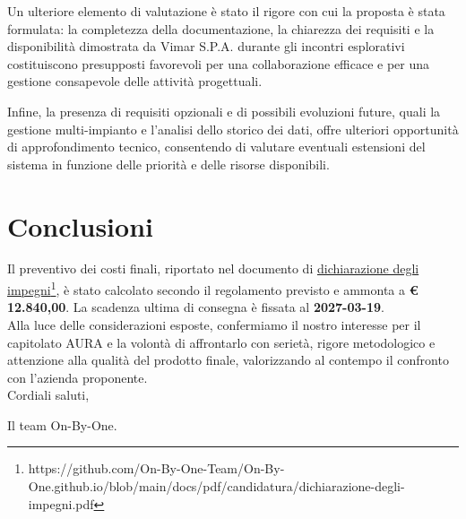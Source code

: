 \documentclass[11pt, a4paper]{article}
\begin{document}
\noindent Un ulteriore elemento di valutazione è stato il rigore con cui la proposta è stata formulata: la completezza della documentazione, la chiarezza dei requisiti e la disponibilità dimostrata da Vimar S.P.A. durante gli incontri esplorativi costituiscono presupposti favorevoli per una collaborazione efficace e per una gestione consapevole delle attività progettuali.

\noindent Infine, la presenza di requisiti opzionali e di possibili evoluzioni future, quali la gestione multi-impianto e l'analisi dello storico dei dati, offre ulteriori opportunità di approfondimento tecnico, consentendo di valutare eventuali estensioni del sistema in funzione delle priorità e delle risorse disponibili. \\

\section{Conclusioni} Il preventivo dei costi finali, riportato nel documento di \href{https://github.com/On-By-One-Team/On-By-One.github.io/blob/main/docs/pdf/candidatura/dichiarazione-degli-impegni.pdf}{dichiarazione degli impegni}\footnote{https://github.com/On-By-One-Team/On-By-One.github.io/blob/main/docs/pdf/candidatura/dichiarazione-degli-impegni.pdf}, è stato calcolato secondo il regolamento previsto e ammonta a \textbf{€ 12.840,00}. La scadenza ultima di consegna è fissata al \textbf{2027-03-19}. \\

\noindent Alla luce delle considerazioni esposte, confermiamo il nostro interesse per il capitolato AURA e la volontà di affrontarlo con serietà, rigore metodologico e attenzione alla qualità del prodotto finale, valorizzando al contempo il confronto con l'azienda proponente. \\

\noindent Cordiali saluti, 

\noindent Il team On-By-One.
\end{document}
